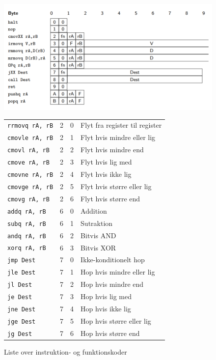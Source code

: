 \begin{figure}[h!]
    \centering
    \includegraphics[width=\textwidth]{figures/icodes.png}
    \begin{tabular}{l|c|c||l}
        \hline
        \verb|rrmovq rA, rB|&2&0&Flyt fra register til register\\
        \verb|cmovle rA, rB|&2&1&Flyt hvis mindre eller lig\\
        \verb|cmovl rA, rB|&2&2&Flyt hvis mindre end\\
        \verb|cmove rA, rB|&2&3&Flyt hvis lig med\\
        \verb|cmovne rA, rB|&2&4&Flyt hvis ikke lig\\
        \verb|cmovge rA, rB|&2&5&Flyt hvis større eller lig\\
        \verb|cmovg rA, rB|&2&6&Flyt hvis større end\\\hline
        \verb|addq rA, rB|&6&0&Addition\\
        \verb|subq rA, rB|&6&1&Sutraktion\\
        \verb|andq rA, rB|&6&2&Bitvis AND\\
        \verb|xorq rA, rB|&6&3&Bitvis XOR\\\hline
        \verb|jmp Dest|&7&0&Ikke-konditionelt hop\\
        \verb|jle Dest|&7&1&Hop hvis mindre eller lig\\
        \verb|jl Dest|&7&2&Hop hvis mindre end\\
        \verb|je Dest|&7&3&Hop hvis lig med\\
        \verb|jne Dest|&7&4&Hop hvis ikke lig\\
        \verb|jge Dest|&7&5&Hop hvis større eller lig\\
        \verb|jg Dest|&7&6&Hop hvis større end\\\hline
    \end{tabular}
    \caption{Liste over instruktion- og funktionskoder}
    \label{fig:icode}
\end{figure}
